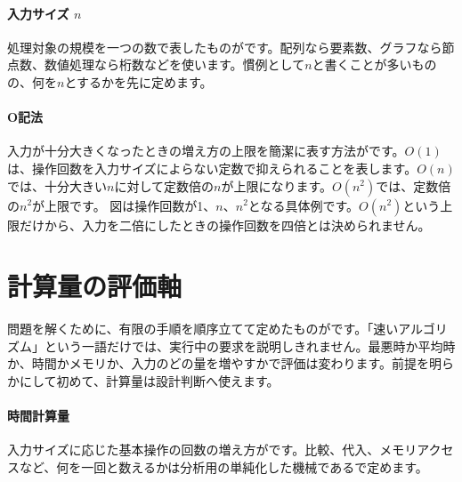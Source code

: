\begingroup
\begingroup
      \centering
\par
\endgroup
\medskip
\begingroup
\paragraph{入力サイズ $n$}
        処理対象の規模を一つの数で表したものがです。配列なら要素数、グラフなら節点数、数値処理なら桁数などを使います。慣例として$n$と書くことが多いものの、何を$n$とするかを先に定めます。

\paragraph{O記法}
        入力が十分大きくなったときの増え方の上限を簡潔に表す方法がです。$O(1)$は、操作回数を入力サイズによらない定数で抑えられることを表します。$O(n)$では、十分大きい$n$に対して定数倍の$n$が上限になります。$O(n^2)$では、定数倍の$n^2$が上限です。
        図は操作回数が1、$n$、$n^2$となる具体例です。$O(n^2)$という上限だけから、入力を二倍にしたときの操作回数を四倍とは決められません。

\par
\endgroup
  \vspace{3mm}
\par
\endgroup


\section{計算量の評価軸}
\label{sec:03-runtime-data-12}

問題を解くために、有限の手順を順序立てて定めたものがです。「速いアルゴリズム」という一語だけでは、実行中の要求を説明しきれません。最悪時か平均時か、時間かメモリか、入力のどの量を増やすかで評価は変わります。前提を明らかにして初めて、計算量は設計判断へ使えます。

\begingroup
\begingroup
\paragraph{時間計算量}
        入力サイズに応じた基本操作の回数の増え方がです。比較、代入、メモリアクセスなど、何を一回と数えるかは分析用の単純化した機械であるで定めます。

